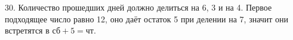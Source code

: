 30. Количество прошедших дней должно делиться на 6, 3 и на 4. Первое подходящее число равно 12, оно даёт остаток 5 при делении на 7, значит они встретятся в $\text{сб}+5=\text{чт}$.\\
